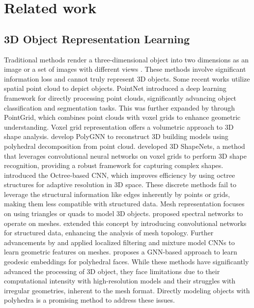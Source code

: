 \section{Related work}
\subsection{3D Object Representation Learning}
Traditional methods render a three-dimensional object into two dimensions as an image or a set of images with different views \citep{qi2016volumetric, su2015multiview}. These methods involve significant information loss and cannot truly represent 3D objects. Some recent works \citep{qi2017pointnet, 8579057} utilize spatial point cloud to depict objects. PointNet \citep{qi2017pointnet} introduced a deep learning framework for directly processing point clouds, significantly advancing object classification and segmentation tasks. This was further expanded by \citet{8579057} through PointGrid, which combines point clouds with voxel grids to enhance geometric understanding. Voxel grid representation offers a volumetric approach to 3D shape analysis. \citet{chen2023polygnn} develop PolyGNN to reconstruct 3D building models using polyhedral decomposition from point cloud. \citet{wu20153dshapenets} developed 3D ShapeNets, a method that leverages convolutional neural networks on voxel grids to perform 3D shape recognition, providing a robust framework for capturing complex shapes. \citet{wang2017ocnn} introduced the Octree-based CNN, which improves efficiency by using octree structures for adaptive resolution in 3D space. These discrete methods fail to leverage the structural information like edges inherently by points or grids, making them less compatible with structured data. 
Mesh representation focuses on using triangles or quads to model 3D objects. \citet{bruna2013spectral} proposed spectral networks to operate on meshes. \citet{henaff2015deep} extended this concept by introducing convolutional networks for structured data, enhancing the analysis of mesh topology. Further advancements by \citet{defferrard2016convolutional} and \citet{monti2017geometric} applied localized filtering and mixture model CNNs to learn geometric features on meshes. \citet{Pang_2023} proposes a GNN-based approach to learn geodesic embeddings for polyhedral faces.  While these methods have significantly advanced the processing of 3D object, they face limitations due to their computational intensity with high-resolution models and their struggles with irregular geometries, inherent to the mesh format. Directly modeling objects with polyhedra is a promising method to address these issues.

